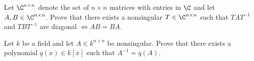 \begin{alist}
\item Let $\C^{n\times n}$ denote the set of $n\times n$ matrices with
entries in $\C$ and let $A,B\in \C^{n\times n}$. Prove that there
exists a nonsingular $T\in \C^{n\times n}$ such that $TAT^{-1}$ and
$TBT^{-1}$ are diagonal $\Leftrightarrow AB=BA$.
\item Let $k$ be a field and let $A\in k^{n\times n}$ be
nonsingular. Prove that there exists a polynomial $q(x)\in k[x]$ such
that $A^{-1}=q(A)$.
\end{alist}

